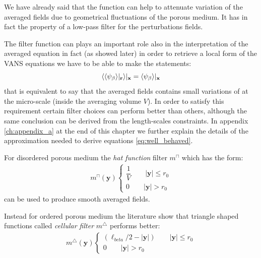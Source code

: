 We have already said that the function can help to attenuate variation of the averaged fields due to geometrical fluctuations of the porous medium.
It has in fact the property of a low-pass filter for the perturbations fields.

The filter function can plays an important role also in the interpretation of the averaged equation in fact (as showed later) in order to retrieve a local form of the VANS equations we have to be able to make the statements:
\begin{equation}
{\left< {\left< \psi_{\beta} \right>}|_{\mathbf{r}} \right>}|_{\mathbf{x}} = {\left< \psi_{\beta} \right>}|_{\mathbf{x}}
\label{eq:well_behaved}
\end{equation}
that is equivalent to say that the averaged fields contains small variations of at the micro-scale (inside the averaging volume $V$).
In order to satisfy this requirement certain filter choices can perform better than others, although the same conclusion can be derived from the length-scales constraints.
In appendix \ref{ch:appendix_a} at the end of this chapter we further explain the details of the approximation needed to derive equations \ref{eq:well_behaved}.

For disordered porous medium the \textit{hat function} filter $m^{\sqcap}$ which has the form:
\begin{eqnarray}
	m^{\sqcap}(\mathbf{y}) 
	\begin{cases}
		\dfrac{1}{V} \qquad |\mathbf{y}| \leqslant r_0\\
		0 \qquad |\mathbf{y}|> r_0
	\end{cases}
\end{eqnarray}
can be used to produce smooth averaged fields.

Instead for ordered porous medium the literature show that triangle shaped functions called \textit{cellular filter}  $m^{\bigtriangleup}$  performs better:
\begin{eqnarray}
m^{\bigtriangleup}(\mathbf{y}) 
\begin{cases}
(\ell_{beta}/2 - |\mathbf{y}|) \qquad |\mathbf{y}| \leqslant r_0\\
0 \qquad |\mathbf{y}|> r_0
\end{cases}
\end{eqnarray}

